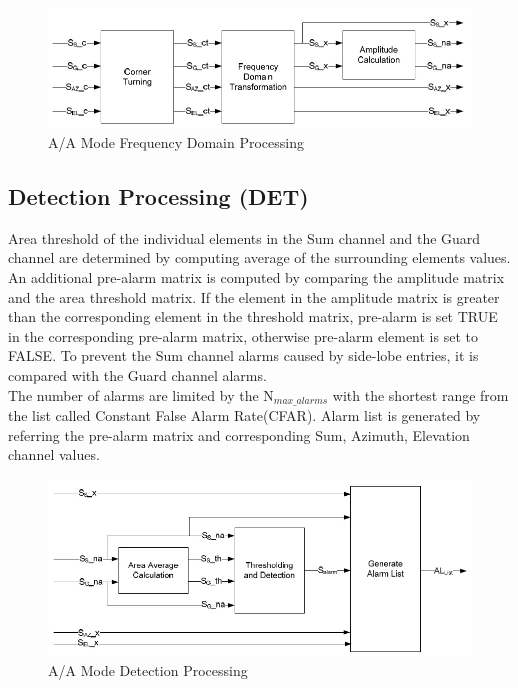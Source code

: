 \begin{figure}[h!]
	\centering
	\includegraphics[width=140mm]{figures/aa_fdp}
	\caption{A/A Mode Frequency Domain Processing}
	\label{fig:bg_related_work:aa_fdp}
\end{figure}

\subsection{Detection Processing (DET)}
Area threshold of the individual elements in the Sum channel and the Guard channel are determined by computing average of the surrounding elements values. An additional pre-alarm matrix is computed by comparing the amplitude matrix and the area threshold matrix. If the element in the amplitude matrix is greater than the corresponding element in the threshold matrix, pre-alarm is set TRUE in the corresponding pre-alarm matrix, otherwise pre-alarm element is set to FALSE. To prevent the Sum channel alarms caused by side-lobe entries, it is compared with the Guard channel alarms. \\The number of alarms are limited by the N$_{max\_alarms}$ with the shortest range from the list called Constant False Alarm Rate(CFAR). Alarm list is generated by referring the pre-alarm matrix and corresponding Sum, Azimuth, Elevation channel values.\\

\begin{figure}[h!]
	\centering
	\includegraphics[width=140mm]{figures/aa_det}
	\caption{A/A Mode Detection Processing}
	\label{fig:bg_related_work:aa_det}
\end{figure}

